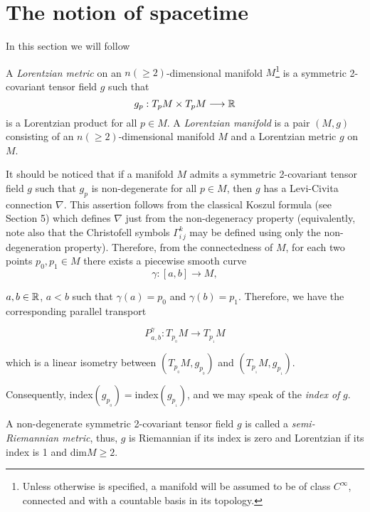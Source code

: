 \chapter{The notion of spacetime}

In this section we will follow \cite{romero10}


A \emph{Lorentzian metric} on an $n(\geq 2)$-dimensional manifold $M$\footnote{Unless otherwise is specified, a manifold will be assumed to be of class $C^{\infty}$, connected and with a countable basis in its topology.} is a symmetric 2-covariant tensor field $g$ such that $$g_p : T_pM\times T_pM \longrightarrow \mathbb{R}$$ is a Lorentzian product for all $p\in M$. A \emph{Lorentzian manifold} is a pair $(M,g)$ consisting of an $n(\geq 2)$-dimensional manifold $M$ and a Lorentzian metric $g$ on $M$.


It should be noticed that if a manifold $M$ admits a symmetric 2-covariant tensor field $g$ such that $g_p$ is non-degenerate for all $p\in M$, then $g$ has a Levi-Civita connection $\nabla$. This assertion follows from the classical Koszul formula (see Section 5) which defines $\nabla$ just from the non-degeneracy property (equivalently, note also that the Christofell symbols $\Gamma_{i\,j}^k$ may be defined using only the non-degeneration property). Therefore, from the connectedness of $M$, for each two points $p_0,p_1\in M$ there exists a piecewise smooth curve
\[
\gamma : [a,b] \longrightarrow M,
\]

$a,b\in \mathbb{R}$, $a<b$ such that $\gamma(a)=p_0$ and $\gamma(b)=p_1$. Therefore, we have the corresponding parallel transport

\[
P_{a,b}^{\gamma} : T_{p_{_0}}M \longrightarrow T_{p_{_1}}M
\]

which is a linear isometry between $(T_{p_{_0}}M,g_{p_{_0}})$ and  $(T_{p_{_1}}M,g_{p_{_1}})$.

Consequently, index$(g_{p_{_0}})=$index$(g_{p_{_1}})$, and we may speak of the \emph{index of} $g$.

A non-degenerate symmetric 2-covariant tensor field $g$ is called a \emph{semi-Riemannian metric}, thus, $g$ is Riemannian if its index is zero and Lorentzian if its index is 1 and dim$M\geq 2$.

